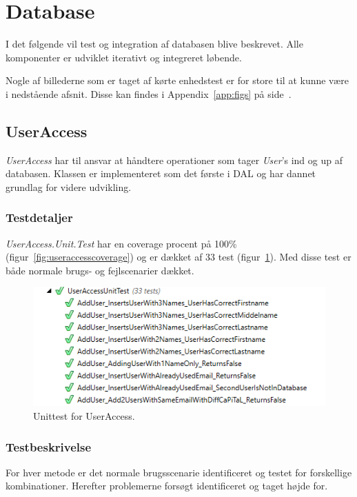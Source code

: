 \section{Database}\label{sec:testdatabase}
I det følgende vil test og integration af databasen blive beskrevet. Alle komponenter er udviklet iterativt og integreret løbende.

Nogle af billederne som er taget af kørte enhedstest er for store til at kunne være i nedstående afsnit. Disse kan findes i Appendix~\ref{app:figs} på side~\pageref{app:figs}.

\subsection{UserAccess}
\textit{UserAccess} har til ansvar at håndtere operationer som tager \textit{User}'s ind og up af databasen. Klassen er implementeret som det første i DAL og har dannet grundlag for videre udvikling.

\subsubsection{Testdetaljer}
\textit{UserAccess.Unit.Test} har en coverage procent på 100\% (figur~\ref{fig:useraccesscoverage}) og er dækket af 33 test (figur~\ref{fig:useraccessunittest}). Med disse test er både normale brugs- og fejlscenarier dækket.

\begin{figure}[h]
\centering
\includegraphics[width=0.9\linewidth]{figs/test/useraccessunittest}
\caption{Unittest for UserAccess.}
\label{fig:useraccessunittest}
\end{figure}

\subsubsection{Testbeskrivelse}
For hver metode er det normale brugsscenarie identificeret og testet for forskellige kombinationer. Herefter problemerne forsøgt identificeret og taget højde for.

